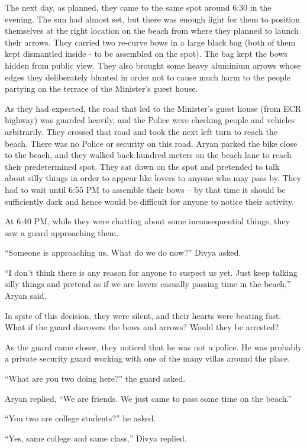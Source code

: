 The next day, as planned, they came to the same spot around 6:30 in the evening.
The sun had almost set, but there was enough light for them to position
themselves at the right location on the beach from where they planned to launch
their arrows. They carried two re-curve bows in a large black bag (both of them
kept dismantled inside - to be assembled on the spot). The bag kept the bows
hidden from public view. They also brought some heavy aluminium arrows whose
edges they deliberately blunted in order not to cause much harm to the people
partying on the terrace of the Minister's guest house.

As they had expected, the road that led to the Minister's guest house (from ECR
highway) was guarded heavily, and the Police were checking people and vehicles
arbitrarily. They crossed that road and took the next left turn to reach the
beach. There was no Police or security on this road. Aryan parked the bike close
to the beach, and they walked back hundred meters on the beach lane to reach
their predetermined spot. They sat down on the spot and pretended to talk about
silly things in order to appear like lovers to anyone who may pass by. They had
to wait until 6:55 PM to assemble their bows – by that time it should be
sufficiently dark and hence would be difficult for anyone to notice their
activity.

At 6:40 PM, while they were chatting about some inconsequential things, they saw
a guard approaching them.

“Someone is approaching us. What do we do now?” Divya asked.

“I don't think there is any reason for anyone to suspect us yet. Just keep
talking silly things and pretend as if we are lovers casually passing time in
the beach,” Aryan said.

In spite of this decision, they were silent, and their hearts were beating fast.
What if the guard discovers the bows and arrows? Would they be arrested?

As the guard came closer, they noticed that he was not a police. He was probably
a private security guard working with one of the many villas around the place.

“What are you two doing here?” the guard asked.

Aryan replied, “We are friends. We just came to pass some time on the beach.”

“You two are college students?” he asked.

“Yes, same college and same class,” Divya replied.

